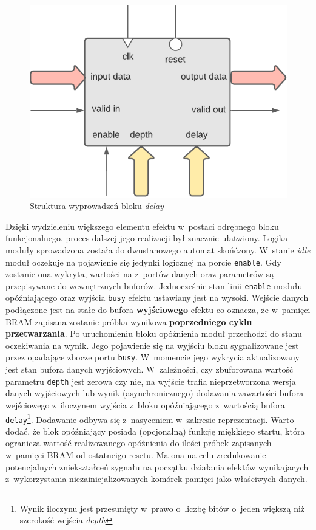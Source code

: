 \vspace{0.5cm}
\begin{figure}[ht]
    \centering
    \includegraphics[scale=0.75]{img/diagrams/delay.pdf}
    \captionsetup{format=plain,justification=centering}
    \caption{Struktura wyprowadzeń bloku \textit{delay}}
    \label{delay-structure}
\end{figure}
\vspace{0.5cm}

Dzięki wydzieleniu większego elementu efektu w~postaci odrębnego bloku funkcjonalnego, proces dalszej jego realizacji był znacznie ułatwiony. Logika moduły sprowadzona została do dwustanowego automat skońćzony. W~stanie \textit{idle} moduł oczekuje na pojawienie się jedynki logicznej na porcie \verb|enable|. Gdy zostanie ona wykryta, wartości na z~portów danych oraz parametrów są przepisywane do wewnętrznych buforów. Jednocześnie stan linii \verb|enable| modułu opóźniającego oraz wyjścia \verb|busy| efektu ustawiany jest na wysoki. Wejście danych podłączone jest na stałe do bufora \textbf{wyjściowego} efektu co oznacza, że w~pamięci BRAM zapisana zostanie próbka wynikowa \textbf{poprzedniego cyklu przetwarzania}. Po uruchomieniu bloku opóźnienia moduł przechodzi do stanu oczekiwania na wynik. Jego pojawienie się na wyjściu bloku sygnalizowane jest przez opadające zbocze portu \verb|busy|. W~momencie jego wykrycia aktualizowany jest stan bufora danych wyjściowych. W~zależności, czy zbuforowana wartość parametru \verb|depth| jest zerowa czy nie, na wyjście trafia nieprzetworzona wersja danych wyjściowych lub wynik (asynchronicznego) dodawania zawartości bufora wejściowego z~iloczynem wyjścia z~bloku opóźniającego z~wartością bufora \verb|delay|\footnote{Wynik iloczynu jest przesunięty w~prawo o~liczbę bitów o~jeden większą niż szerokość wejścia \textit{depth}}. Dodawanie odbywa się z~nasyceniem w~zakresie reprezentacji. Warto dodać, że blok opóźniający posiada (opcjonalną) funkcję miękkiego startu, która ogranicza wartość realizowanego opóźnienia do ilości próbek zapisanych w~pamięci BRAM od ostatneigo resetu. Ma ona na celu zredukowanie potencjalnych zniekształceń sygnału na początku działania efektów wynikajacych z~wykorzystania niezainicjalizowanych komórek pamięci jako właściwych danych.

